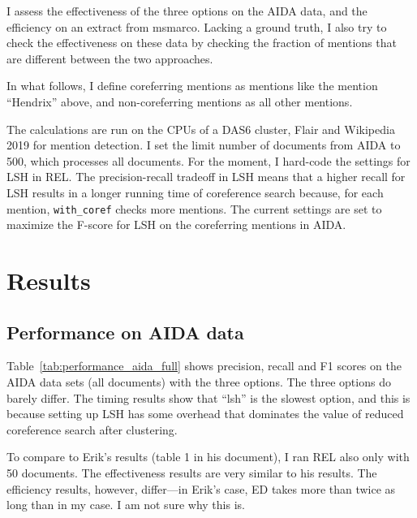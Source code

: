 \documentclass[a4paper,11pt]{article}
\numberwithin{equation}{section} %
\begin{document}
I assess the effectiveness of the three options on the AIDA data, and the efficiency on an extract from msmarco. Lacking a ground truth, I also try to check the effectiveness on these data by checking the fraction of mentions that are different between the two approaches. 

In what follows, I define coreferring mentions as mentions like the mention ``Hendrix'' above, and non-coreferring mentions as all other mentions.

The calculations are run on the CPUs of a DAS6 cluster, Flair and Wikipedia 2019 for mention detection. I set the limit number of documents from AIDA to 500, which processes all documents. 
For the moment, I hard-code the settings for LSH in REL. The precision-recall tradeoff in LSH means that a higher recall for LSH results in a longer running time of coreference search because, for each mention, \verb|with_coref| checks more mentions. 
The current settings are set to maximize the F-score for LSH on the coreferring mentions in AIDA.



\section{Results}

\subsection{Performance on AIDA data}

Table~\ref{tab:performance_aida_full} shows precision, recall and F1 scores on the AIDA data sets (all documents) with the three options.
The three options do barely differ. The timing results show that ``lsh'' is the slowest option, and this is because setting up LSH has some overhead that dominates the value of reduced coreference search after clustering.

To compare to Erik's results (table 1 in his document), I ran REL also only with 50 documents. The effectiveness results are very similar to his results. The efficiency results, however, differ---in Erik's case, ED takes more than twice as long than in my case. I am not sure why this is.
\end{document}
